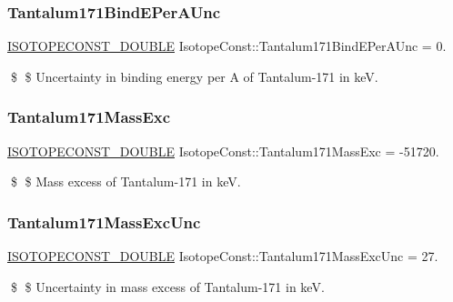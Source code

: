 \subsubsection{\texorpdfstring{Tantalum171\+Bind\+E\+Per\+A\+Unc}{Tantalum171BindEPerAUnc}}
{\footnotesize\ttfamily \mbox{\hyperlink{group___isotope_const-_macros_ga8f45a7272ce02c0b4c65c44636ed719a}{I\+S\+O\+T\+O\+P\+E\+C\+O\+N\+S\+T\+\_\+\+D\+O\+U\+B\+LE}} Isotope\+Const\+::\+Tantalum171\+Bind\+E\+Per\+A\+Unc = 0.}

\$ \$ Uncertainty in binding energy per A of Tantalum-\/171 in keV. \mbox{\label{group___isotope_const-_tantalum-_ta171_ga054479e6d7ead7359b11d4e5a1f3b8c7}} 
\subsubsection{\texorpdfstring{Tantalum171\+Mass\+Exc}{Tantalum171MassExc}}
{\footnotesize\ttfamily \mbox{\hyperlink{group___isotope_const-_macros_ga8f45a7272ce02c0b4c65c44636ed719a}{I\+S\+O\+T\+O\+P\+E\+C\+O\+N\+S\+T\+\_\+\+D\+O\+U\+B\+LE}} Isotope\+Const\+::\+Tantalum171\+Mass\+Exc = -\/51720.}

\$ \$ Mass excess of Tantalum-\/171 in keV. \mbox{\label{group___isotope_const-_tantalum-_ta171_gaef0f1f5741addba1b10c429e3093668d}} 
\subsubsection{\texorpdfstring{Tantalum171\+Mass\+Exc\+Unc}{Tantalum171MassExcUnc}}
{\footnotesize\ttfamily \mbox{\hyperlink{group___isotope_const-_macros_ga8f45a7272ce02c0b4c65c44636ed719a}{I\+S\+O\+T\+O\+P\+E\+C\+O\+N\+S\+T\+\_\+\+D\+O\+U\+B\+LE}} Isotope\+Const\+::\+Tantalum171\+Mass\+Exc\+Unc = 27.}

\$ \$ Uncertainty in mass excess of Tantalum-\/171 in keV. \mbox{\label{group___isotope_const-_tantalum-_ta171_ga8c964977cb2afd6d2501e8fb4d66b619}} 
